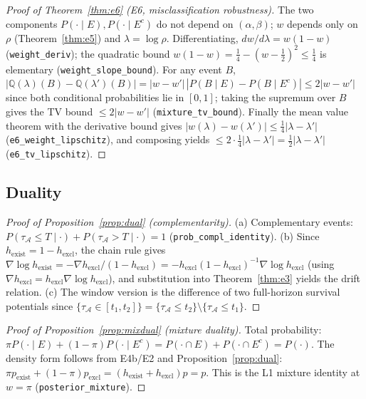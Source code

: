 \documentclass[11pt]{article}
\newcommand{\Aregion}{\mathcal{A}}
\newcommand{\lean}[1]{\texttt{#1}}
\begin{document}
\begin{proof}[Proof of Theorem~\ref{thm:e6} (E6, misclassification robustness)]
The two components $P(\cdot\mid E),P(\cdot\mid E^c)$ do not depend on $(\alpha,\beta)$;
$w$ depends only on $\rho$ (Theorem~\ref{thm:e5}) and $\lambda=\log\rho$. Differentiating,
$dw/d\lambda=w(1-w)$ (\lean{weight\_deriv}); the quadratic bound
$w(1-w)=\tfrac14-(w-\tfrac12)^2\le\tfrac14$ is elementary (\lean{weight\_slope\_bound}).
For any event $B$,
$|\mathbb{Q}(\lambda)(B)-\mathbb{Q}(\lambda')(B)|=|w-w'|\,|P(B\mid E)-P(B\mid E^c)|
\le 2|w-w'|$ since both conditional probabilities lie in $[0,1]$; taking the supremum over
$B$ gives the TV bound $\le 2|w-w'|$ (\lean{mixture\_tv\_bound}). Finally the mean value
theorem with the derivative bound gives $|w(\lambda)-w(\lambda')|\le\tfrac14|\lambda-\lambda'|$
(\lean{e6\_weight\_lipschitz}), and composing yields
$\le 2\cdot\tfrac14|\lambda-\lambda'|=\tfrac12|\lambda-\lambda'|$ (\lean{e6\_tv\_lipschitz}).
\end{proof}

\subsection{Duality}

\begin{proof}[Proof of Proposition~\ref{prop:dual} (complementarity)]
(a) Complementary events: $P(\tau_{\Aregion}\le T\mid\cdot)+P(\tau_{\Aregion}>T\mid\cdot)=1$
(\lean{prob\_compl\_identity}). (b) Since $h_{\mathrm{exist}}=1-h_{\mathrm{excl}}$, the chain rule
gives $\nabla\log h_{\mathrm{exist}}=-\nabla h_{\mathrm{excl}}/(1-h_{\mathrm{excl}})
=-h_{\mathrm{excl}}(1-h_{\mathrm{excl}})^{-1}\nabla\log h_{\mathrm{excl}}$ (using
$\nabla h_{\mathrm{excl}}=h_{\mathrm{excl}}\nabla\log h_{\mathrm{excl}}$), and substitution into
Theorem~\ref{thm:e3} yields the drift relation. (c) The window version is the difference of two
full-horizon survival potentials since
$\{\tau_{\Aregion}\in[t_1,t_2]\}=\{\tau_{\Aregion}\le t_2\}\setminus\{\tau_{\Aregion}\le t_1\}$.
\end{proof}

\begin{proof}[Proof of Proposition~\ref{prop:mixdual} (mixture duality)]
Total probability: $\pi P(\cdot\mid E)+(1-\pi)P(\cdot\mid E^c)=P(\cdot\cap E)+P(\cdot\cap
E^c)=P(\cdot)$. The density form follows from E4b/E2 and Proposition~\ref{prop:dual}:
$\pi p_{\mathrm{exist}}+(1-\pi)p_{\mathrm{excl}}=(h_{\mathrm{exist}}+h_{\mathrm{excl}})p=p$.
This is the L1 mixture identity at $w=\pi$ (\lean{posterior\_mixture}).
\end{proof}
\end{document}
